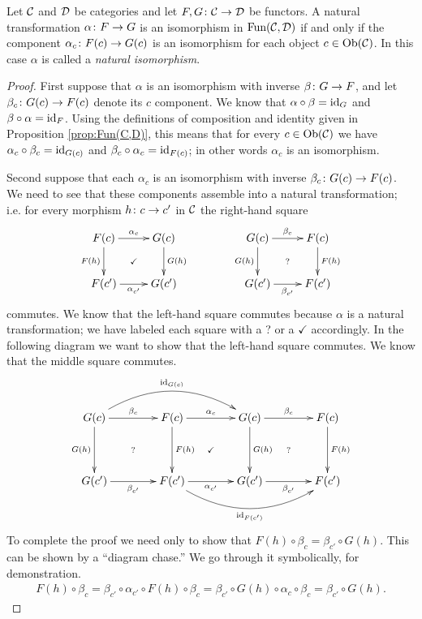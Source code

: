 \begin{lemma}\label{lemma:natural iso}

Let $\mathcal{C}$ and $\mathcal{D}$ be categories and let $F,G\colon\mathcal{C}\rightarrow\mathcal{D}$ be functors. A natural transformation $\alpha\colon F\rightarrow G$ is an isomorphism in $\textnormal{Fun}(\mathcal{C},\mathcal{D})$ if and only if the component $\alpha_c\colon F(c)\rightarrow G(c)$ is an isomorphism for each object $c\in\textnormal{Ob}(\mathcal{C})$. In this case $\alpha$ is called a {\em natural isomorphism}.

\end{lemma}

\begin{proof}

First suppose that $\alpha$ is an isomorphism with inverse $\beta\colon G\rightarrow F$, and let $\beta_c\colon G(c)\rightarrow F(c)$ denote its $c$ component. We know that $\alpha\circ\beta=\textnormal{id}_G$ and $\beta\circ\alpha=\textnormal{id}_F$. Using the definitions of composition and identity given in Proposition \ref{prop:Fun(C,D)}, this means that for every $c\in\textnormal{Ob}(\mathcal{C})$ we have $\alpha_c\circ\beta_c=\textnormal{id}_{G(c)}$ and $\beta_c\circ\alpha_c=\textnormal{id}_{F(c)}$; in other words $\alpha_c$ is an isomorphism.

Second suppose that each $\alpha_c$ is an isomorphism with inverse $\beta_c\colon G(c)\rightarrow F(c)$. We need to see that these components assemble into a natural transformation; i.e. for every morphism $h\colon c\rightarrow c'$ in $\mathcal{C}$ the right-hand square 
$$
\xymatrix{F(c)\ar@{}[dr]|{\checkmark}\ar[d]_{F(h)}\ar[r]^{\alpha_c}&G(c)\ar[d]^{G(h)}\\F(c')\ar[r]_{\alpha_{c'}}&G(c')}\hspace{.5in}
\xymatrix{G(c)\ar@{}[dr]|{?}\ar[d]_{G(h)}\ar[r]^{\beta_c}&F(c)\ar[d]^{F(h)}\\G(c')\ar[r]_{\beta_{c'}}&F(c')}
$$
commutes. We know that the left-hand square commutes because $\alpha$ is a natural transformation; we have labeled each square with a ? or a $\checkmark$ accordingly. In the following diagram we want to show that the left-hand square commutes. We know that the middle square commutes.
$$
\xymatrix@=40pt{G(c)\ar@/^2pc/[rr]^{\id_{G(c)}}\ar@{}[dr]|{?}\ar[d]_{G(h)}\ar[r]^{\beta_c}&F(c)\ar@{}[dr]|{\checkmark}\ar[d]^{F(h)}\ar[r]^{\alpha_c}&G(c)\ar@{}[dr]|{?}\ar[d]^{G(h)}\ar[r]^{\beta_c}&F(c)\ar[d]^{F(h)}\\
G(c')\ar[r]_{\beta_{c'}}&F(c')\ar[r]_{\alpha_{c'}}\ar@/_2pc/[rr]_{\id_{F(c')}}&G(c')\ar[r]_{\beta_{c'}}&F(c')}
$$
To complete the proof we need only to show that $F(h)\circ\beta_c=\beta_{c'}\circ G(h)$. This can be shown by a “diagram chase.” We go through it symbolically, for demonstration.
\begin{align*}
F(h)\circ\beta_c=\beta_{c'}\circ\alpha_{c'}\circ F(h)\circ\beta_c=\beta_{c'}\circ G(h)\circ\alpha_c\circ\beta_c=\beta_{c'}\circ G(h).
\end{align*}

\end{proof}

